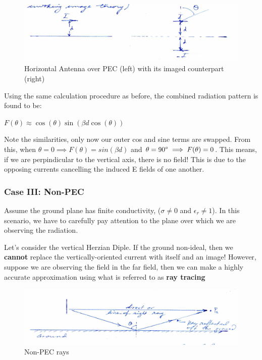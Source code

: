 \documentclass{article}
\begin{document}
\begin{figure}[H]
  \centering
     \includegraphics[scale=0.4]{Course Notes/images/9.3.png}
  \caption{Horizontal Antenna over PEC (left) with its imaged counterpart (right)}
\end{figure}

Using the same calculation procedure as before, the combined radiation pattern is found to be:

\begin{center}
    $F(\theta) \approx \cos(\theta) \sin(\beta d \cos(\theta))$
\end{center}

Note the similarities, only now our outer cos and sine terms are swapped. From this, when $\theta = 0 \implies F(\theta) = sin(\beta d)$ and $\theta = 90 \degree \implies F(\theta) = 0$. This means, if we are perpindicular to the vertical axis, there is no field! This is due to the opposing currents cancelling the induced E fields of one another.

\subsubsection{Case III: Non-PEC}

Assume the ground plane has finite conductivity, ($\sigma \ne 0$ and $\epsilon_r \ne 1$). In this scenario, we have to carefully pay attention to the plane over which we are observing the radiation.

Let's consider the vertical Herzian Diple. If the ground non-ideal, then we \textbf{cannot} replace the vertically-oriented current with itself and an image! However, suppose we are observing the field in the far field, then we can make a highly accurate approximation using what is referred to as \textbf{ray tracing}

\begin{figure}[H]
  \centering
     \includegraphics[scale=0.6]{Course Notes/images/9.4.png}
  \caption{Non-PEC rays}
\end{figure}
\end{document}
